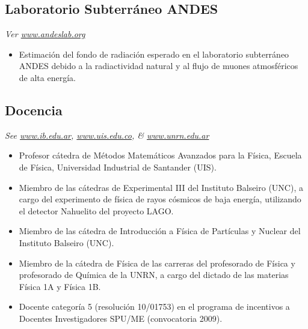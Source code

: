 \subsection*{Laboratorio Subterráneo ANDES}
{\small{\textit{Ver \href{http://www.andeslab.org}{www.andeslab.org}}}}
\begin{itemize}
\item Estimación del fondo de radiación esperado en el laboratorio subterráneo ANDES debido a la radiactividad natural y al flujo de muones atmosféricos de alta energía.
\end{itemize}

\subsection*{Docencia}
{\small{\textit{See \href{http://www.ib.edu.ar}{www.ib.edu.ar}, \href{http://www.uis.edu.co}{www.uis.edu.co}, \& \href{http://www.unrn.edu.ar}{www.unrn.edu.ar}}}}
\begin{itemize}
\item Profesor cátedra de Métodos Matemáticos Avanzados para la Física, Escuela de Física, Universidad Industrial de Santander (UIS).
\item Miembro de las cátedras de Experimental III del Instituto Balseiro (UNC), a cargo del experimento de física de rayos cósmicos de baja energía, utilizando el detector Nahuelito del proyecto LAGO.
\item Miembro de las cátedra de Introducción a Física de Partículas y Nuclear del Instituto Balseiro (UNC).
\item Miembro de la cátedra de Física de las carreras del profesorado de Física y profesorado de Química de la UNRN, a cargo del dictado de las materias Física 1A y Física 1B.
\item Docente categoría 5 (resolución 10/01753) en el programa de incentivos a Docentes Investigadores SPU/ME (convocatoria 2009).
\end{itemize}
\fi
